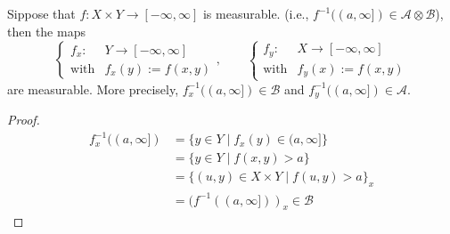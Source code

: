 \begin{proposition}
Sippose that $f:X\times Y\to[-\infty,\infty]$ is measurable.
(i.e., $f^{-1}((a,\infty])\in\mathcal{A}\otimes\mathcal{B}$), then the maps 
\[\left\{
\begin{array}{ll}
f_x:&Y\to[-\infty,\infty]\\
\text{with}&f_x(y):=f(x,y)
\end{array}\right.,\qquad\left\{
\begin{array}{ll}
f_y:&X\to[-\infty,\infty]\\
\text{with}&f_y(x):=f(x,y)
\end{array}\right.
\]
are measurable.
More precisely, $f_x^{-1}((a,\infty])\in\mathcal{B}$ and $f_y^{-1}((a,\infty])\in\mathcal{A}$.
\end{proposition}

\begin{proof}
\begin{align*}
f_x^{-1}((a,\infty])&=\{y\in Y\mid f_x(y)\in(a,\infty]\}\\
&=\{y\in Y\mid f(x,y)>a\}\\
&=\{(u,y)\in X\times Y\mid f(u,y)>a\}_x\\
&=(f^{-1}((a,\infty]))_x\in\mathcal{B}
\end{align*}
\end{proof}



















